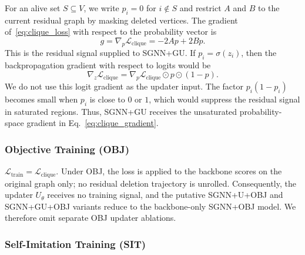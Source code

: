 \documentclass[mathematics,article,submit,pdftex,moreauthors]{Definitions/mdpi}
\begin{document}
For an alive set $S\subseteq V$, we write $p_i=0$ for $i\notin S$ and restrict
$A$ and $B$ to the current residual graph by masking deleted vertices. The gradient
of~\eqref{eq:clique_loss} with respect to the probability vector is
\begin{equation}
  g
  =
  \nabla_p \mathcal{L}_{\mathrm{clique}}
  =
  -2Ap + 2Bp .
  \label{eq:clique_gradient}
\end{equation}
This is the residual signal supplied to \textsc{SGNN+GU}. If $p_i=\sigma(z_i)$, then the backpropagation gradient with respect to logits would
be
\[
  \nabla_z \mathcal{L}_{\mathrm{clique}}
  =
  \nabla_p \mathcal{L}_{\mathrm{clique}} \odot p \odot (1-p).
\]
We do not use this logit gradient as the updater input. The factor $p_i(1-p_i)$
becomes small when $p_i$ is close to $0$ or $1$, which would suppress the residual
signal in saturated regions. Thus, \textsc{SGNN+GU} receives the unsaturated
probability-space gradient in Eq.~\eqref{eq:clique_gradient}.

\subsubsection{Objective Training (OBJ)}

$\mathcal{L}_{\mathrm{train}} = \mathcal{L}_{\mathrm{clique}}$. Under OBJ, the
loss is applied to the backbone scores on the original graph only; no residual
deletion trajectory is unrolled. Consequently, the updater $U_\theta$ receives no
training signal, and the putative \textsc{SGNN+U}+OBJ and \textsc{SGNN+GU}+OBJ
variants reduce to the backbone-only \textsc{SGNN}+OBJ model. We therefore omit
separate OBJ updater ablations.

\subsubsection{Self-Imitation Training (SIT)}
\end{document}
